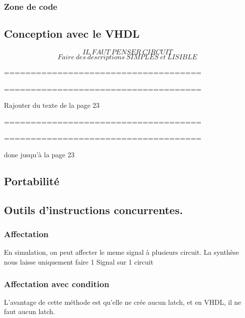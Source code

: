 \subsubsection{Zone de code}


\newpage
\subsection{Conception avec le VHDL}

$$IL~FAUT~PENSER~CIRCUIT$$
$$Faire~des~descriptions~SIMPLES~et~LISIBLE$$

=====================================

=====================================

Rajouter du texte de la page 23

=====================================

=====================================

done jusqu'à la page 23

\subsection{Portabilité}


\subsection{Outils d'instructions concurrentes.}


\subsubsection{Affectation}



En simulation, on peut affecter le meme signal à plusieurs circuit. La synthèse nous laisse uniquement faire 1 Signal sur 1 circuit

\subsubsection{Affectation avec condition}
L'avantage de cette méthode est qu'elle ne crée aucun latch, et en VHDL, il ne faut aucun latch.

